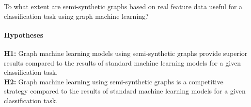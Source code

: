 	\noindent To what extent are semi-synthetic graphs based on real 
				feature data useful for a classification task using graph 
				machine learning?

	\paragraph{Hypotheses}\mbox{}

	\noindent\textbf{H1:} Graph machine learning models using semi-synthetic 
	graphs provide superior results compared to the results of standard machine
	learning models for a given classification task.\\

	\noindent\textbf{H2:} Graph machine learning using semi-synthetic graphs is 
	a competitive strategy compared to the results of standard machine learning 
	models for a given classification task.

